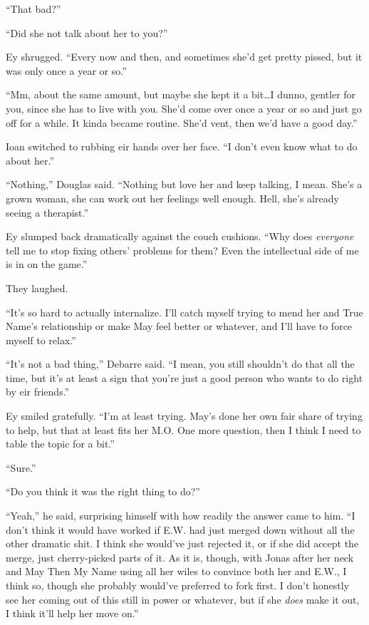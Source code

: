 ``That bad?''

``Did she not talk about her to you?''

Ey shrugged. ``Every now and then, and sometimes she'd get pretty pissed, but it was only once a year or so.''

``Mm, about the same amount, but maybe she kept it a bit\ldots I dunno, gentler for you, since she has to live with you. She'd come over once a year or so and just go off for a while. It kinda became routine. She'd vent, then we'd have a good day.''

Ioan switched to rubbing eir hands over her face. ``I don't even know what to do about her.''

``Nothing,'' Douglas said. ``Nothing but love her and keep talking, I mean. She's a grown woman, she can work out her feelings well enough. Hell, she's already seeing a therapist.''

Ey slumped back dramatically against the couch cushions. ``Why does \emph{everyone} tell me to stop fixing others' problems for them? Even the intellectual side of me is in on the game.''

They laughed.

``It's so hard to actually internalize. I'll catch myself trying to mend her and True Name's relationship or make May feel better or whatever, and I'll have to force myself to relax.''

``It's not a bad thing,'' Debarre said. ``I mean, you still shouldn't do that all the time, but it's at least a sign that you're just a good person who wants to do right by eir friends.''

Ey smiled gratefully. ``I'm at least trying. May's done her own fair share of trying to help, but that at least fits her M.O. One more question, then I think I need to table the topic for a bit.''

``Sure.''

``Do you think it was the right thing to do?''

``Yeah,'' he said, surprising himself with how readily the answer came to him. ``I don't think it would have worked if E.W. had just merged down without all the other dramatic shit. I think she would've just rejected it, or if she did accept the merge, just cherry-picked parts of it. As it is, though, with Jonas after her neck and May Then My Name using all her wiles to convince both her and E.W., I think so, though she probably would've preferred to fork first. I don't honestly see her coming out of this still in power or whatever, but if she \emph{does} make it out, I think it'll help her move on.''

